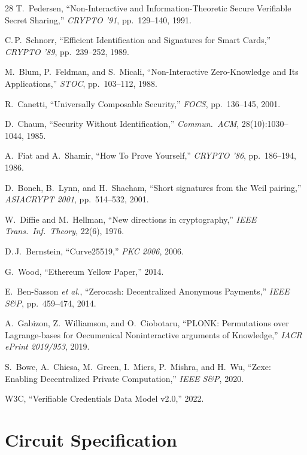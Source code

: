 \documentclass[11pt,a4paper]{article}
\begin{document}
\begin{thebibliography}{28}
T.~Pedersen,
``Non-Interactive and Information-Theoretic Secure Verifiable Secret Sharing,''
\emph{CRYPTO '91}, pp.~129--140, 1991.

C.\,P.~Schnorr,
``Efficient Identification and Signatures for Smart Cards,''
\emph{CRYPTO '89}, pp.~239--252, 1989.

M.~Blum, P.~Feldman, and S.~Micali,
``Non-Interactive Zero-Knowledge and Its Applications,''
\emph{STOC}, pp.~103--112, 1988.

R.~Canetti,
``Universally Composable Security,''
\emph{FOCS}, pp.~136--145, 2001.

D.~Chaum,
``Security Without Identification,''
\emph{Commun.\ ACM}, 28(10):1030--1044, 1985.

A.~Fiat and A.~Shamir,
``How To Prove Yourself,''
\emph{CRYPTO '86}, pp.~186--194, 1986.

D.~Boneh, B.~Lynn, and H.~Shacham,
``Short signatures from the Weil pairing,''
\emph{ASIACRYPT 2001}, pp.~514--532, 2001.

W.~Diffie and M.~Hellman,
``New directions in cryptography,''
\emph{IEEE Trans.\ Inf.\ Theory}, 22(6), 1976.

D.\,J.~Bernstein,
``Curve25519,''
\emph{PKC 2006}, 2006.

G.~Wood,
``Ethereum Yellow Paper,''
2014.

E.~Ben-Sasson \emph{et al.},
``Zerocash: Decentralized Anonymous Payments,''
\emph{IEEE S\&P}, pp.~459--474, 2014.

A.~Gabizon, Z.~Williamson, and O.~Ciobotaru,
``PLONK: Permutations over Lagrange-bases for Oecumenical Noninteractive arguments of Knowledge,''
\emph{IACR ePrint 2019/953}, 2019.

S.~Bowe, A.~Chiesa, M.~Green, I.~Miers, P.~Mishra, and H.~Wu,
``Zexe: Enabling Decentralized Private Computation,''
\emph{IEEE S\&P}, 2020.

W3C,
``Verifiable Credentials Data Model v2.0,''
2022.

\end{thebibliography}

\appendix

\section{Circuit Specification}
\label{app:circuit}
\end{document}
